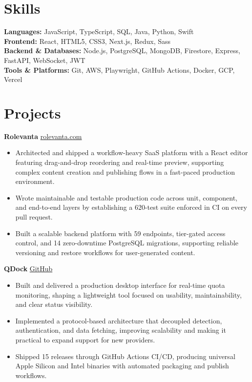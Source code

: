 \documentclass[11pt]{article}       %
\begin{document}
\vspace{-10.5pt}

\section*{Skills}
\textbf{Languages:} JavaScript, TypeScript, SQL, Java, Python, Swift \\
\textbf{Frontend:} React, HTML5, CSS3, Next.js, Redux, Sass \\
\textbf{Backend \& Databases:} Node.js, PostgreSQL, MongoDB, Firestore, Express, FastAPI, WebSocket, JWT \\
\textbf{Tools \& Platforms:} Git, AWS, Playwright, GitHub Actions, Docker, GCP, Vercel
\vspace{-5pt}






\section*{Projects}
\textbf{Rolevanta} \hfill \href{https://rolevanta.com}{rolevanta.com} \\
\vspace{-9pt}
\begin{itemize}
  \item Architected and shipped a workflow-heavy SaaS platform with a React editor featuring drag-and-drop reordering and real-time preview, supporting complex content creation and publishing flows in a fast-paced production environment.
  \item Wrote maintainable and testable production code across unit, component, and end-to-end layers by establishing a 620-test suite enforced in CI on every pull request.
  \item Built a scalable backend platform with 59 endpoints, tier-gated access control, and 14 zero-downtime PostgreSQL migrations, supporting reliable versioning and restore workflows for user-generated content.
\end{itemize}

\textbf{QDock} \hfill \href{https://github.com/altansaid/QDock}{GitHub} \\
\vspace{-9pt}
\begin{itemize}
  \item Built and delivered a production desktop interface for real-time quota monitoring, shaping a lightweight tool focused on usability, maintainability, and clear status visibility.
  \item Implemented a protocol-based architecture that decoupled detection, authentication, and data fetching, improving scalability and making it practical to expand support for new providers.
  \item Shipped 15 releases through GitHub Actions CI/CD, producing universal Apple Silicon and Intel binaries with automated packaging and publish workflows.
\end{itemize}
\end{document}
